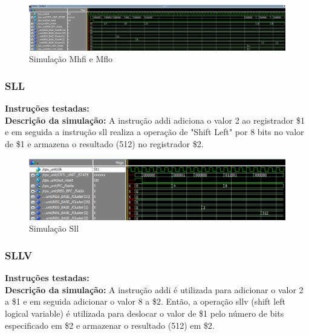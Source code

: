 \begin{figure}[htbp!]
\centering
\includegraphics[width=1\textwidth]{figure/simulacao_mhfi_mflo.png}
\caption{Simulação Mhfi e Mflo} 
\label{fig:imagem_massa}
\end{figure}

\newpage

\subsubsection{SLL}
\textbf{Instruções testadas:}
 \\

\textbf{Descrição da simulação:} A instrução addi adiciona o valor 2 ao registrador \$1 e em seguida a instrução sll realiza a operação de "Shift Left" por 8 bits no valor de \$1 e armazena o resultado (512) no registrador \$2. \\

\begin{figure}[htbp!]
\centering
\includegraphics[width=1\textwidth]{figure/simulacao_sll.png}
\caption{Simulação Sll} 
\label{fig:imagem_massa}
\end{figure}


\subsubsection{SLLV}
\textbf{Instruções testadas:}
 \\

\textbf{Descrição da simulação:} A instrução addi é utilizada para adicionar o valor 2 a \$1 e em seguida adicionar o valor 8 a \$2. Então, a operação sllv (shift left logical variable) é utilizada para deslocar o valor de \$1 pelo número de bits especificado em \$2 e armazenar o resultado (512) em \$2.\\

